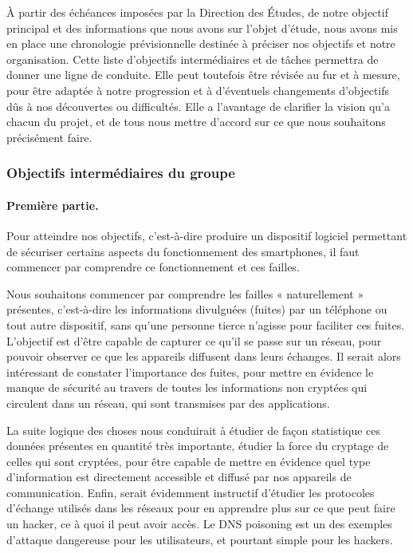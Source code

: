 \documentclass[a4paper, 12pt,twoside]{article}
\begin{document}
	À partir des échéances imposées par la Direction des Études, de notre objectif principal et des informations que nous avons sur l'objet d'étude, nous avons mis en place une chronologie prévisionnelle destinée à préciser nos objectifs et notre organisation. Cette liste d'objectifs intermédiaires et de tâches permettra de donner une ligne de conduite. Elle peut toutefois être révisée au fur et à mesure, pour être adaptée à notre progression et à d'éventuels changements d'objectifs dûs à nos découvertes ou difficultés. Elle a l'avantage de clarifier la vision qu'a chacun du projet, et de tous nous mettre d'accord sur ce que nous souhaitons précisément faire.
	
		\subsubsection{Objectifs intermédiaires du groupe}
		
		\paragraph{Première partie. } Pour atteindre nos objectifs, c'est-à-dire produire un dispositif logiciel permettant de sécuriser certains aspects du fonctionnement des smartphones, il faut commencer par comprendre ce fonctionnement et ces failles.
		
		Nous souhaitons commencer par comprendre les failles « naturellement » présentes, c'est-à-dire les informations divulguées (fuites) par un téléphone ou tout autre dispositif, sans qu'une personne tierce n'agisse pour faciliter ces fuites. L'objectif est d'être capable de capturer ce qu'il se passe sur un réseau, pour pouvoir observer ce que les appareils diffusent dans leurs échanges. Il serait alors intéressant de constater l'importance des fuites, pour mettre en évidence le manque de sécurité au travers de toutes les informations non cryptées qui circulent dans un réseau, qui sont transmises par des applications.
		
		La suite logique des choses nous conduirait à étudier de façon statistique ces données présentes en quantité très importante, étudier la force du cryptage de celles qui sont cryptées, pour être capable de mettre en évidence quel type d'information est directement accessible et diffusé par nos appareils de communication. Enfin, serait évidemment instructif d'étudier les protocoles d'échange utilisés dans les réseaux pour en apprendre plus sur ce que peut faire un hacker, ce à quoi il peut avoir accès. Le DNS poisoning est un des exemples d'attaque dangereuse pour les utilisateurs, et pourtant simple pour les hackers.
		
\end{document}
